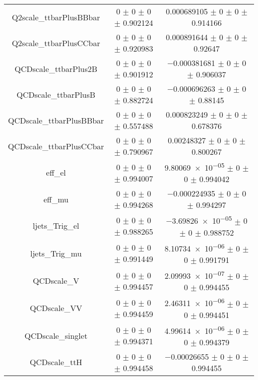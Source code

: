 \begin{table}
\begin{tabular}{ccc}
Q2scale\_ttbarPlusBBbar & \num{0} $\pm$ \num{0} $\pm$ \num{0} $\pm$ \num{0.902124} & \num{0.000689105} $\pm$ \num{0} $\pm$ \num{0} $\pm$ \num{0.914166}\\
Q2scale\_ttbarPlusCCbar & \num{0} $\pm$ \num{0} $\pm$ \num{0} $\pm$ \num{0.920983} & \num{0.000891644} $\pm$ \num{0} $\pm$ \num{0} $\pm$ \num{0.92647}\\
QCDscale\_ttbarPlus2B & \num{0} $\pm$ \num{0} $\pm$ \num{0} $\pm$ \num{0.901912} & \num{-0.000381681} $\pm$ \num{0} $\pm$ \num{0} $\pm$ \num{0.906037}\\
QCDscale\_ttbarPlusB & \num{0} $\pm$ \num{0} $\pm$ \num{0} $\pm$ \num{0.882724} & \num{-0.000696263} $\pm$ \num{0} $\pm$ \num{0} $\pm$ \num{0.88145}\\
QCDscale\_ttbarPlusBBbar & \num{0} $\pm$ \num{0} $\pm$ \num{0} $\pm$ \num{0.557488} & \num{0.000823249} $\pm$ \num{0} $\pm$ \num{0} $\pm$ \num{0.678376}\\
QCDscale\_ttbarPlusCCbar & \num{0} $\pm$ \num{0} $\pm$ \num{0} $\pm$ \num{0.790967} & \num{0.00248327} $\pm$ \num{0} $\pm$ \num{0} $\pm$ \num{0.800267}\\
eff\_el & \num{0} $\pm$ \num{0} $\pm$ \num{0} $\pm$ \num{0.994007} & \num{9.80069e-05} $\pm$ \num{0} $\pm$ \num{0} $\pm$ \num{0.994042}\\
eff\_mu & \num{0} $\pm$ \num{0} $\pm$ \num{0} $\pm$ \num{0.994268} & \num{-0.000224935} $\pm$ \num{0} $\pm$ \num{0} $\pm$ \num{0.994297}\\
ljets\_Trig\_el & \num{0} $\pm$ \num{0} $\pm$ \num{0} $\pm$ \num{0.988265} & \num{-3.69826e-05} $\pm$ \num{0} $\pm$ \num{0} $\pm$ \num{0.988752}\\
ljets\_Trig\_mu & \num{0} $\pm$ \num{0} $\pm$ \num{0} $\pm$ \num{0.991449} & \num{8.10734e-06} $\pm$ \num{0} $\pm$ \num{0} $\pm$ \num{0.991791}\\
QCDscale\_V & \num{0} $\pm$ \num{0} $\pm$ \num{0} $\pm$ \num{0.994457} & \num{2.09993e-07} $\pm$ \num{0} $\pm$ \num{0} $\pm$ \num{0.994455}\\
QCDscale\_VV & \num{0} $\pm$ \num{0} $\pm$ \num{0} $\pm$ \num{0.994459} & \num{2.46311e-06} $\pm$ \num{0} $\pm$ \num{0} $\pm$ \num{0.994451}\\
QCDscale\_singlet & \num{0} $\pm$ \num{0} $\pm$ \num{0} $\pm$ \num{0.994371} & \num{4.99614e-06} $\pm$ \num{0} $\pm$ \num{0} $\pm$ \num{0.994379}\\
QCDscale\_ttH & \num{0} $\pm$ \num{0} $\pm$ \num{0} $\pm$ \num{0.994458} & \num{-0.00026655} $\pm$ \num{0} $\pm$ \num{0} $\pm$ \num{0.994455}\\

\end{tabular}
\end{table}
